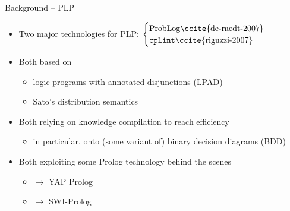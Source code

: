 \documentclass[presentation]{beamer}\mode<presentation>{\usetheme{AMSBolognaFC}}
\begin{document}
\begin{frame}[c]{Background -- PLP}

    \begin{itemize}
        \item Two major technologies for PLP: $\begin{cases}
            \text{\problog\ccite{de-raedt-2007}}
            \\
            \text{\cplint\ccite{riguzzi-2007}}
        \end{cases}$

        \bigskip

        \item Both based on
        \begin{itemize}
            \item logic programs with annotated disjunctions (\alert{LPAD})

            \item Sato's \alert{distribution semantics}
        \end{itemize}

        \bigskip

        \item Both relying on \alert{knowledge compilation} to reach efficiency
        \begin{itemize}
            \item in particular, onto (some variant of) binary decision diagrams (BDD)
        \end{itemize}

        \bigskip

        \item Both exploiting some \alert{Prolog technology} behind the scenes
        \begin{itemize}
            \item \problog{} $\longrightarrow$ YAP Prolog
            \item \cplint{} $\longrightarrow$ SWI-Prolog
        \end{itemize}

    \end{itemize}

\end{frame}
\end{document}
